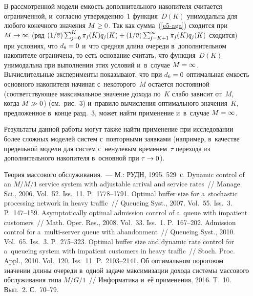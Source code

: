 \begin{multicols}{2}
  В рассмотренной модели емкость дополнительного накопителя считается 
ограниченной, и~согласно утверждению~1 функция~$D(K)$ унимодальна для 
любого конечного значения $M\hm\geq 0$. Так как сумма~(\ref{e5-aga}) 
сходится при $M\hm\to \infty$ (ряд 
$(1/\overline{v})\sum\nolimits^K_{j=0}\pi_j(K) q_j(K)\hm+ 
(1/\overline{v})\sum\nolimits^\infty_{j=K+1} \pi_j(K) q_j(K)$ сходится) при 
условиях, что $d_6\hm=0$ и~что средняя длина очереди в~дополнительном 
накопителе ограничена, то есть основание считать, что функция~$D(K)$ 
унимодальна при выполнении этих условий и~в~случае $M\hm=\infty$. 
Вычислительные эксперименты показывают, что при $d_6\hm=0$ оптимальная 
емкость основного накопителя начиная с~некоторого~$M$ остается 
постоянной (соответствующее максимальное значение дохода по~$K$ слабо 
зависит от~$M$, когда $M\hm\gg 0$) (см.\ рис.~3) и~правило вы\-чис\-ле\-ния 
оптимального значения~$K$, предложенное в~конце разд.~3, может найти 
применение и~в~случае $M\hm=\infty$.
  
  Результаты данной работы могут также найти применение при исследовании 
более сложных моделей систем с~повторными заявками (например, в~качестве 
предельной модели для систем с~ненулевым временем~$\tau$ перехода из 
дополнительного накопителя в~основной при $\tau\hm\to 0$). 
  
{\small\frenchspacing
 {%
 \begin{thebibliography}{99}
  
 Теория массового обслуживания.~--- М.: РУДН, 1995. 
529~с.
 Dynamic control of an $M/M/1$ service system with adjustable arrival and 
service rates~// Manage. Sci., 2006. Vol.~52. Iss.~11. P.~1778--1791.
 Optimal buffer size for a~stochastic processing network 
in heavy traffic~// Queueing Syst., 2007. Vol.~55. Iss.~3. P.~147--159.
 Asymptotically optimal admission control of a~queue with impatient 
customers~// Math. Oper. Res., 2008. Vol.~33. Iss.~1. P.~167--202.
 Admission control for a~multi-server 
queue with abandonment~// Queueing Syst., 2010. Vol.~65. Iss.~3. P.~275--323.
 Optimal buffer size and dynamic rate control for 
a~queueing system with impatient customers in heavy traffic~// Stoch. Proc. 
Appl., 2010. Vol.~120. Iss.~11. P.~2103--2141.
 Об оптимальном пороговом значении 
длины очереди в~одной задаче максимизации дохода системы массового обслуживания 
типа $M/G/1$~// Информатика и~её применения, 2016. Т.~10. Вып.~2. С.~70--79.


\end{thebibliography}}}
\end{multicols}
